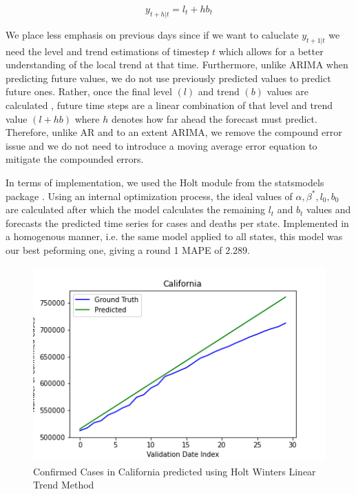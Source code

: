 \documentclass[sigconf,nonacm]{acmart}
\begin{document}
\begin{equation}
  y_{t+h|t} = l_t + hb_t
\end{equation}

We place less emphasis on previous days since if we want to caluclate
$y_{t+1|t}$ we need the level and trend estimations of timestep $t$ which
allows for a better understanding of the local trend at that time. Furthermore,
unlike ARIMA when predicting future values, we do not use previously predicted
values to predict future ones. Rather, once the final level $(l)$ and trend
$(b)$ values are calculated , future time steps are a linear combination of
that level and trend value $(l + hb)$ where $h$ denotes how far ahead the
forecast must predict. Therefore, unlike AR and to an extent ARIMA, we remove
the compound error issue and we do not need to introduce a moving average error
equation to mitigate the compounded errors. 

In terms of implementation, we used the Holt module from the statsmodels
package \cite{statsmodels}. Using an internal optimization process, the ideal
values of $\alpha, \beta^*, l_0, b_0$ are calculated after which the model
calculates the remaining $l_t$ and $b_t$ values and forecasts the predicted
time series for cases and deaths per state. Implemented in a homogenous manner,
i.e. the same model applied to all states, this model was our best peforming
one, giving a round 1 MAPE of $2.289$. 

\begin{figure}
  \includegraphics[width=\linewidth]{figures/HOLT_Cali_Conf.png}
  \caption{Confirmed Cases in California predicted using Holt Winters Linear
  Trend Method}
  \label{fig:HOLT}
\end{figure}
\end{document}
